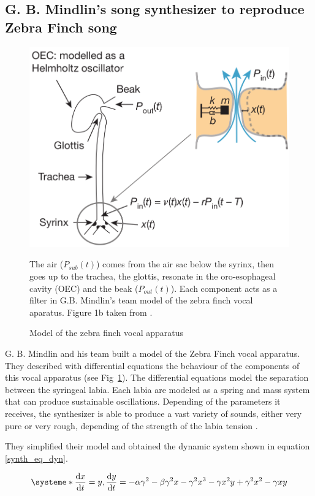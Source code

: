 \documentclass{report}
\begin{document}
\subsection{G. B. Mindlin's song synthesizer to reproduce Zebra Finch song}
\label{description-of-perl-song-synthesizer-to-reproduce-zebra-finch-song}

\begin{figure}[htbp]
  {\center
  \includegraphics[width=0.5\linewidth]{media/scheme_vocal_apparatus}
  \caption{Model of the zebra finch vocal apparatus\label{zf-vocal-aparatus}}}
  \small

  The air (\(P_{sub}(t)\)) comes from the air sac below the syrinx, then goes up
  to the trachea, the glottis, resonate in the oro-esophageal cavity (OEC) and
  the beak (\(P_{out}(t)\)). Each component acts as a filter in G.B. Mindlin's
  team model of the zebra finch vocal aparatus. Figure 1b taken from
  \textcite{amador_elemental_2013}.

\end{figure}

G. B. Mindlin and his team built a model of the Zebra Finch vocal apparatus.
They described with differential equations the behaviour of the components of
this vocal apparatus (see Fig~\ref{zf-vocal-aparatus}). The differential
equations model the separation between the syringeal labia. Each labia are
modeled as a spring and mass system that can produce sustainable oscillations.
Depending of the parameters it receives, the synthesizer is able to produce a
vast variety of sounds, either very pure or very rough, depending of the
strength of the labia tension \parencite{amador_beyond_2008,
boari_automatic_2015}.

They simplified their model and obtained the dynamic system shown in equation
\ref{synth_eq_dyn}.

\begin{equation}
\systeme*{
\dv{x}{t} = y,
\dv{y}{t} = - \alpha \gamma^2 - \beta \gamma^2 x - \gamma^2 x^3 - \gamma x^2 y
    + \gamma^2 x^2 - \gamma x y
}
\label{synth_eq_dyn}
\end{equation}
\end{document}
